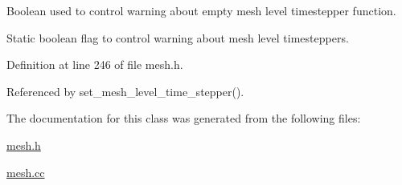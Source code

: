Boolean used to control warning about empty mesh level timestepper function. 

Static boolean flag to control warning about mesh level timesteppers. 

Definition at line 246 of file mesh.\+h.



Referenced by set\+\_\+mesh\+\_\+level\+\_\+time\+\_\+stepper().



The documentation for this class was generated from the following files\+:\begin{DoxyCompactItemize}
\item 
\hyperlink{mesh_8h}{mesh.\+h}\item 
\hyperlink{mesh_8cc}{mesh.\+cc}\end{DoxyCompactItemize}
